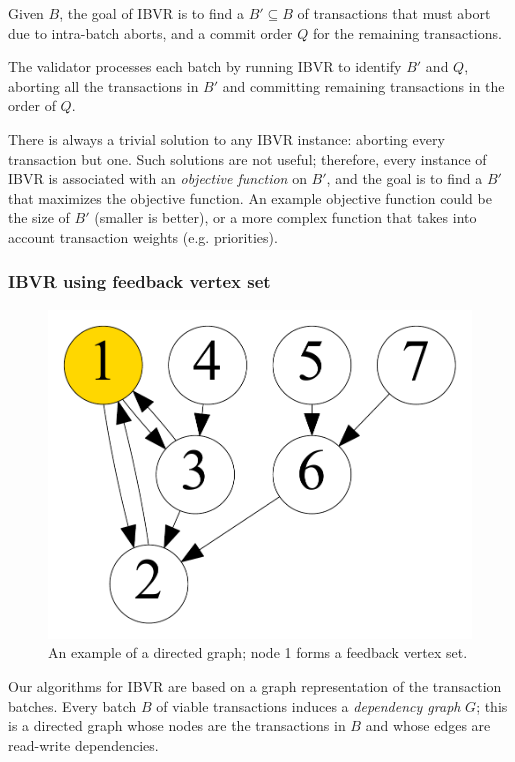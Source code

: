 Given $B$, the goal of IBVR is to find a $B' \subseteq B$ of transactions that must abort due to intra-batch aborts, and a commit order $Q$ for the remaining transactions.

The validator processes each batch by running IBVR to identify $B'$ and $Q$, aborting all the transactions in $B'$ and committing remaining transactions in the order of $Q$.

There is always a trivial solution to any IBVR instance: aborting every transaction but one. Such solutions are not useful; therefore, every instance of IBVR is associated with an \emph{objective function} on $B'$, and the goal is to find a $B'$ that maximizes the objective function. An example objective function could be the size of $B'$ (smaller is better), or a more complex function that takes into account transaction weights (e.g. priorities).

\subsubsection{IBVR using feedback vertex set}

\begin{figure}[t]
\centering
\includegraphics[width=0.3\columnwidth]{./alg_fig/fvs-eg}
\vspace{-1em}
\caption{An example of a directed graph; node 1 forms a feedback vertex set.}
\vspace{-1em}
\label{fig:fvs}
\end{figure}

Our algorithms for IBVR are based on a graph representation of the transaction batches. Every batch $B$ of viable transactions induces a \emph{dependency graph} $G$; this is a directed graph whose nodes are the transactions in $B$ and whose edges are read-write dependencies.


